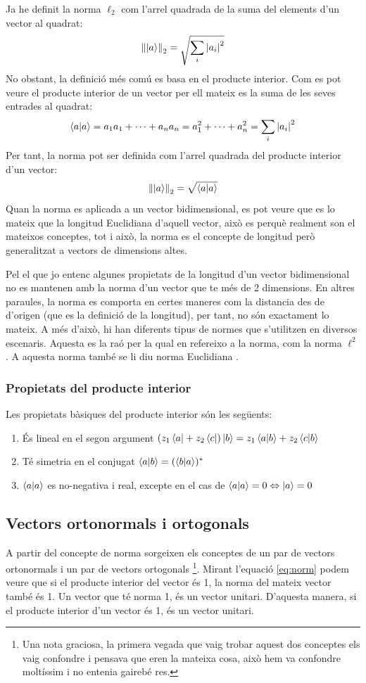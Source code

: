Ja he definit la norma $\ell_2$ com l'arrel quadrada de la suma del elements d'un vector al quadrat:
$$
\norm{\ket{a}}_2 = \sqrt{\sum_{i} \abs{a_{i}}^2}
$$
No obstant, la definició més comú es basa en el producte interior. Com es pot veure el producte interior de un vector per ell mateix es la suma de les seves entrades al quadrat:
$$
\bra{a}\ket{a} = a_1 a_1 + \cdots + a_n a_n = a_1^2 + \cdots +  a_n^2 \\= \sum_{i} \abs{a_i}^2
$$
Per tant, la norma pot ser definida com l'arrel quadrada del producte interior d'un vector:
\begin{equation}
\norm{\ket{a}}_2 = \sqrt{\bra{a}\ket{a}}
\label{eq:norm}
\end{equation}
Quan la norma es aplicada a un vector bidimensional, es pot veure que es lo mateix que la longitud Euclidiana d'aquell vector, això es perquè realment son el mateixos conceptes, tot i això, la norma es el concepte de longitud però generalitzat a vectors de dimensions altes. 

Pel el que jo entenc algunes propietats de la longitud d'un vector bidimensional no es mantenen amb la norma d'un vector que te més de 2 dimensions. En altres paraules, la norma es comporta en certes maneres com la distancia des de d'origen (que es la definició de la longitud), per tant, no són exactament lo mateix. A més d’això, hi han diferents tipus de normes que s'utilitzen en diversos escenaris. Aquesta es la raó per la qual en refereixo a la norma, com la norma $\ell^2$. A aquesta norma també se li diu norma Euclidiana \cite{wolfram:2norm}.

\subsubsection{Propietats del producte interior}
Les propietats bàsiques del producte interior són les següents:
\begin{enumerate}
	\item És lineal en el segon argument $ (z_1\bra{a}+ z_2\bra{c})\ket{b} = z_1\bra{a}\ket{b} + z_2\bra{c}\ket{b}$
	\item Té simetria en el conjugat $\bra{a}\ket{b} = (\bra{b}\ket{a})^*$
	\item $\bra{a}\ket{a}$ es no-negativa i real, excepte en el cas de $\bra{a}\ket{a} = 0 \Leftrightarrow \ket{a} = 0$
\end{enumerate}

 
\subsection{Vectors ortonormals i ortogonals}
A partir del concepte de norma sorgeixen els conceptes de un par de vectors ortonormals i un par de vectors ortogonals \footnote{Una nota graciosa, la primera vegada que vaig trobar aquest dos conceptes els vaig confondre i pensava que eren la mateixa cosa, això hem va confondre moltíssim i no entenia gairebé res.}.
Mirant l'equació \eqref{eq:norm} podem veure que si el producte interior del vector és 1, la norma del mateix vector també és 1. Un vector que té norma 1, és un vector unitari. D'aquesta manera, si el producte interior d'un vector és 1, és un vector unitari. 


